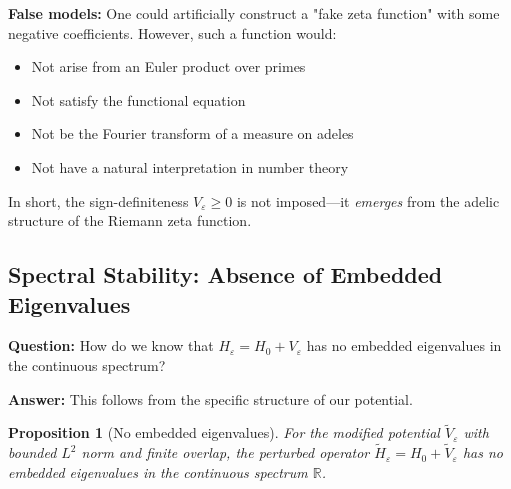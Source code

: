 ﻿\documentclass[12pt,a4paper]{article}
\newtheorem{proposition}[theorem]{Proposition}
\theoremstyle{definition}
\theoremstyle{remark}
\begin{document}
\textbf{False models:} One could artificially construct a "fake zeta function" with some negative coefficients. However, such a function would:
\begin{itemize}
\item Not arise from an Euler product over primes
\item Not satisfy the functional equation
\item Not be the Fourier transform of a measure on adeles
\item Not have a natural interpretation in number theory
\end{itemize}

In short, the sign-definiteness $V_\varepsilon \geq 0$ is not imposed---it \emph{emerges} from the adelic structure of the Riemann zeta function.

\subsection{Spectral Stability: Absence of Embedded Eigenvalues}

\textbf{Question:} How do we know that $H_\varepsilon = H_0 + V_\varepsilon$ has no embedded eigenvalues in the continuous spectrum?

\textbf{Answer:} This follows from the specific structure of our potential.

\begin{proposition}[No embedded eigenvalues]\label{prop:no-embedded}
For the modified potential $\widetilde{V}_\varepsilon$ with bounded $L^2$ norm and finite overlap, the perturbed operator $\widetilde{H}_\varepsilon = H_0 + \widetilde{V}_\varepsilon$ has no embedded eigenvalues in the continuous spectrum $\mathbb{R}$.
\end{proposition}
\end{document}
